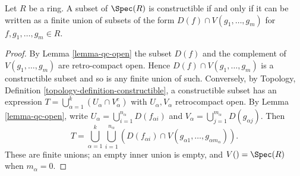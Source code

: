 \begin{lemma}
\label{lemma-constructible}
Let $R$ be a ring. A subset of $\Spec(R)$ is constructible if and only
if it can be written as a finite union of subsets of the form
$D(f) \cap V(g_1, \ldots, g_m)$ for $f, g_1, \ldots, g_m \in R$.
\end{lemma}

\begin{proof}
By Lemma \ref{lemma-qc-open} the subset $D(f)$ and the complement of
$V(g_1, \ldots, g_m)$ are retro-compact open. Hence
$D(f) \cap V(g_1, \ldots, g_m)$ is a constructible subset and so is
any finite union of such. Conversely, by Topology, Definition
\ref{topology-definition-constructible}, a constructible subset has an
expression $T=\bigcup_{\alpha=1}^k(U_\alpha\cap V_\alpha^c)$ with
$U_\alpha,V_\alpha$ retrocompact open. By Lemma \ref{lemma-qc-open}, write
$U_\alpha=\bigcup_{i=1}^{n_\alpha}D(f_{\alpha i})$ and
$V_\alpha=\bigcup_{j=1}^{m_\alpha}D(g_{\alpha j})$. Then
$$
T=\bigcup_{\alpha=1}^k\bigcup_{i=1}^{n_\alpha}
\left(D(f_{\alpha i})\cap
V(g_{\alpha1},\ldots,g_{\alpha m_\alpha})\right).
$$
These are finite unions; an empty inner union is empty, and
$V()=\Spec(R)$ when $m_\alpha=0$.
\end{proof}